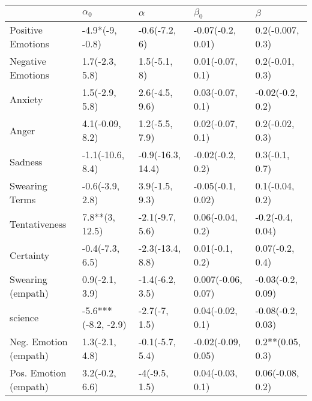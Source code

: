 \begin{tabular}{lllll}
\toprule
{} &           $\alpha_0$ &           $\alpha$ &           $\beta_0$ &            $\beta$ \\
\midrule
Positive Emotions     &      -4.9*(-9, -0.8) &      -0.6(-7.2, 6) &   -0.07(-0.2, 0.01) &   0.2(-0.007, 0.3) \\
Negative Emotions     &       1.7(-2.3, 5.8) &       1.5(-5.1, 8) &    0.01(-0.07, 0.1) &    0.2(-0.01, 0.3) \\
Anxiety               &       1.5(-2.9, 5.8) &     2.6(-4.5, 9.6) &    0.03(-0.07, 0.1) &   -0.02(-0.2, 0.2) \\
Anger                 &      4.1(-0.09, 8.2) &     1.2(-5.5, 7.9) &    0.02(-0.07, 0.1) &    0.2(-0.02, 0.3) \\
Sadness               &     -1.1(-10.6, 8.4) &  -0.9(-16.3, 14.4) &    -0.02(-0.2, 0.2) &     0.3(-0.1, 0.7) \\
Swearing Terms        &      -0.6(-3.9, 2.8) &     3.9(-1.5, 9.3) &   -0.05(-0.1, 0.02) &    0.1(-0.04, 0.2) \\
Tentativeness         &       7.8**(3, 12.5) &    -2.1(-9.7, 5.6) &    0.06(-0.04, 0.2) &   -0.2(-0.4, 0.04) \\
Certainty             &      -0.4(-7.3, 6.5) &   -2.3(-13.4, 8.8) &     0.01(-0.1, 0.2) &    0.07(-0.2, 0.4) \\
Swearing (empath)     &       0.9(-2.1, 3.9) &    -1.4(-6.2, 3.5) &  0.007(-0.06, 0.07) &  -0.03(-0.2, 0.09) \\
science               &  -5.6***(-8.2, -2.9) &      -2.7(-7, 1.5) &    0.04(-0.02, 0.1) &  -0.08(-0.2, 0.03) \\
Neg. Emotion (empath) &       1.3(-2.1, 4.8) &    -0.1(-5.7, 5.4) &  -0.02(-0.09, 0.05) &   0.2**(0.05, 0.3) \\
Pos. Emotion (empath) &       3.2(-0.2, 6.6) &      -4(-9.5, 1.5) &    0.04(-0.03, 0.1) &   0.06(-0.08, 0.2) \\
\bottomrule
\end{tabular}

